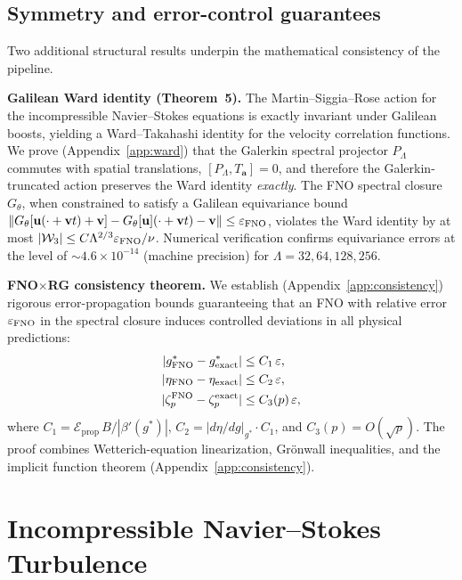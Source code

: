 \subsection{Symmetry and error-control guarantees}

Two additional structural results underpin the mathematical consistency of the pipeline.

\textbf{Galilean Ward identity (Theorem~5).} The Martin--Siggia--Rose action for the incompressible Navier--Stokes equations is exactly invariant under Galilean boosts, yielding a Ward--Takahashi identity for the velocity correlation functions. We prove (Appendix~\ref{app:ward}) that the Galerkin spectral projector $P_\Lambda$ commutes with spatial translations, $[P_\Lambda, T_{\mathbf{a}}]=0$, and therefore the Galerkin-truncated action preserves the Ward identity \emph{exactly}. The FNO spectral closure $G_\theta$, when constrained to satisfy a Galilean equivariance bound $\|G_\theta[\mathbf{u}(\cdot+\mathbf{v}t)+\mathbf{v}]-G_\theta[\mathbf{u}](\cdot+\mathbf{v}t)-\mathbf{v}\|\leq\varepsilon_{\text{FNO}}$, violates the Ward identity by at most $|\mathcal{W}_3|\leq C\Lambda^{2/3}\varepsilon_{\text{FNO}}/\nu$. Numerical verification confirms equivariance errors at the level of $\sim 4.6\times 10^{-14}$ (machine precision) for $\Lambda=32,64,128,256$.

\textbf{FNO$\times$RG consistency theorem.} We establish (Appendix~\ref{app:consistency}) rigorous error-propagation bounds guaranteeing that an FNO with relative error $\varepsilon_{\text{FNO}}$ in the spectral closure induces controlled deviations in all physical predictions:
\begin{equation}
\begin{aligned}
|g^*_{\text{FNO}}-g^*_{\mathrm{exact}}| &\leq C_1\,\varepsilon, \\
|\eta_{\text{FNO}}-\eta_{\mathrm{exact}}| &\leq C_2\,\varepsilon, \\
|\zeta_p^{\text{FNO}}-\zeta_p^{\mathrm{exact}}| &\leq C_3(p)\,\varepsilon,
\end{aligned}
\end{equation}
where $C_1=\mathcal{E}_{\mathrm{prop}}\,B/|\beta'(g^*)|$, $C_2=|d\eta/dg|_{g^*}\cdot C_1$, and $C_3(p)=O(\sqrt{p})$. The proof combines Wetterich-equation linearization, Gr\"onwall inequalities, and the implicit function theorem (Appendix~\ref{app:consistency}).

\section{Incompressible Navier--Stokes Turbulence\label{sec:ns}}

